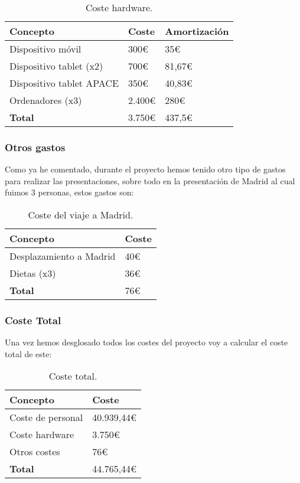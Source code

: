 \begin{table}[H]
	\centering
	\begin{tabular}{lll}
		\toprule
		\textbf{Concepto}        & \textbf{Coste} & \textbf{Amortización} \\ \midrule
		Dispositivo móvil        & 300\euro        & 35\euro                \\
		Dispositivo tablet (x2)  & 700\euro        & 81,67\euro             \\
		Dispositivo tablet APACE & 350\euro        & 40,83\euro             \\
		Ordenadores (x3)         & 2.400\euro       & 280\euro               \\ \midrule
		\textbf{Total}           & 3.750\euro       & 437,5\euro             \\ \bottomrule
	\end{tabular}
	\caption{Coste hardware.}
\end{table}

\subsubsection{Otros gastos}
Como ya he comentado, durante el proyecto hemos tenido otro tipo de gastos para realizar las presentaciones, sobre todo en la presentación de Madrid al cual fuimos 3 personas, estos gastos son:

\begin{table}[H]
	\centering
	\begin{tabular}{ll}
		\toprule
		\textbf{Concepto}       & \textbf{Coste} \\ \midrule
		Desplazamiento a Madrid & 40\euro         \\
		Dietas (x3)             & 36\euro         \\ \midrule
		\textbf{Total}          & 76\euro         \\ \bottomrule
	\end{tabular}
	\caption{Coste del viaje a Madrid.}
\end{table}

\subsubsection{Coste Total}
Una vez hemos desglosado todos los costes del proyecto voy a calcular el coste total de este:

\begin{table}[H]
	\centering
	\begin{tabular}{ll}
		\toprule
		\textbf{Concepto} & \textbf{Coste} \\ \midrule
		Coste de personal & 40.939,44\euro   \\
		Coste hardware    & 3.750\euro       \\
		Otros costes      & 76\euro         \\ \midrule
		\textbf{Total}    & 44.765,44\euro   \\ \bottomrule
	\end{tabular}
	\caption{Coste total.}
\end{table}

